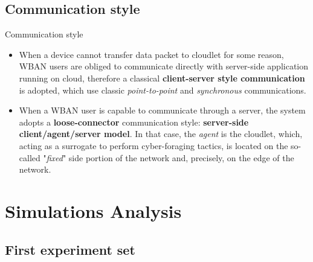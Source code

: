 \documentclass[10pt]{beamer}
\begin{document}
\subsection{Communication style}
\begin{frame}{Communication style} 

\begin{itemize}

\item When a device cannot transfer data packet to cloudlet for some reason, WBAN users are obliged to communicate directly with server-side application running on cloud, therefore a classical \textbf{client-server style communication} is adopted, which use classic \textit{point-to-point} and \textit{synchronous} communications.

\item When a WBAN user is capable to communicate through a server, the system adopts a \textbf{loose-connector} communication style: \textbf{server-side client/agent/server model}. In that case, the \textit{agent} is the cloudlet, which, acting as a surrogate to perform cyber-foraging tactics, is located on the so-called "\textit{fixed}" side portion of the network and, precisely, on the edge of the network. 

\end{itemize}

\end{frame} 

\section{Simulations Analysis}
\subsection{First experiment set}
\end{document}
